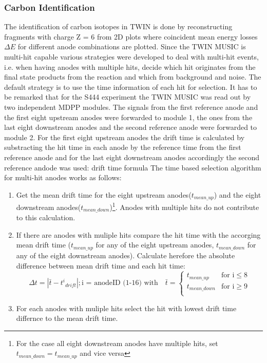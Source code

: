 \subsubsection{Carbon Identification}\label{subsec:carbon_id}
The identification of carbon isotopes in TWIN is done by reconstructing fragments with charge Z = 6 from 2D plots where coincident mean energy losses $\Delta E$ for different anode combinations are plotted. Since the TWIN MUSIC is multi-hit capable various strategies were developed to deal with multi-hit events, i.e. when having anodes with multiple hits, decide which hit originates from the final state products from the reaction and which from background and noise.\newline
The default strategy is to use the time information of each hit for selection. It has to be remarked that for the S444 experiment the TWIN MUSIC was read out by two independent MDPP modules\cite{MDPP-16}. The signals from the first reference anode and the first eight upstream anodes were forwarded to module 1, the ones from the last eight downstream anodes and the second reference anode were forwarded to module 2. For the first eight upstream anodes the drift time is calculated by substracting the hit time in each anode by the reference time from the first reference anode and for the last eight downstream anodes accordingly the second reference andode was used:\newline
drift time formula
The time based selection algorithm for multi-hit anodes works as follows:\newline
\begin{enumerate}
\itemsep0em
\item Get the mean drift time for the eight upstream anodes($t_{mean\_up}$) and the eight downstream anodes($t_{mean\_down}$)\footnote{For the case all eight downstream anodes have multiple hits, set $t_{mean\_down} = t_{mean\_up}$ and vice versa}. Anodes with multiple hits do not contribute to this calculation.
\item If there are anodes with muliple hits compare the hit time with the accorging mean drift time ($t_{mean\_up}$ for any of the eight upstream anodes, $t_{mean\_down}$ for any of the eight downstream anodes). Calculate herefore the absolute difference between mean drift time and each hit time:
\begin{equation}
\Delta t = | \bar{t} - {t^i}_{drift}|;  \text{i = anodeID (1-16) with} \quad \bar{t} = 
\begin{cases}
t_{mean\_up} & \text{for i} \leq 8\\
t_{mean\_down} & \text{for i} \geq 9 \\
\end{cases}
\end{equation}
\item For each anodes with muliple hits select the hit with lowest drift time differnce to the mean drift time.
\end{enumerate}
